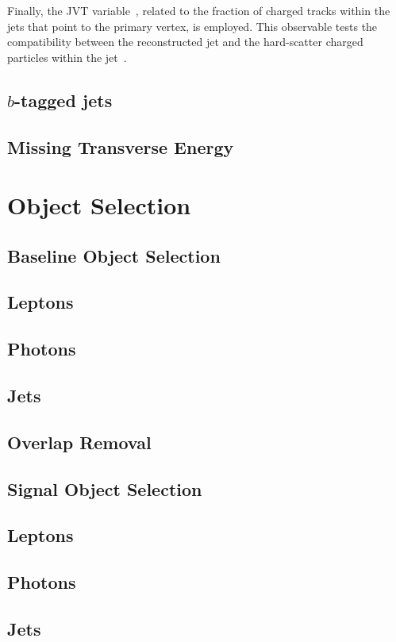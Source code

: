			Finally, the \ac{JVT} variable~\cite{ATLAS-CONF-2014-018}, related to the fraction of charged tracks within the jets that point to the primary vertex, is employed. This observable tests the compatibility between the reconstructed jet and the hard-scatter charged particles within the jet~\cite{Aaboud:2017pou}.


		\subsection*{$b$-tagged jets}




		\subsection*{Missing Transverse Energy}



			 



	\section{Object Selection}
	\label{sec:objSel}

		\subsection{Baseline Object Selection}
		\label{subsec:baseObjSel}

			\subsection*{Leptons}
			
			\subsection*{Photons}
			
			\subsection*{Jets}


		\subsection{Overlap Removal}
		\label{subsec:OR}

		\subsection{Signal Object Selection}
		\label{subsec:sigObjSel}

			\subsection*{Leptons}

			\subsection*{Photons}

			\subsection*{Jets}